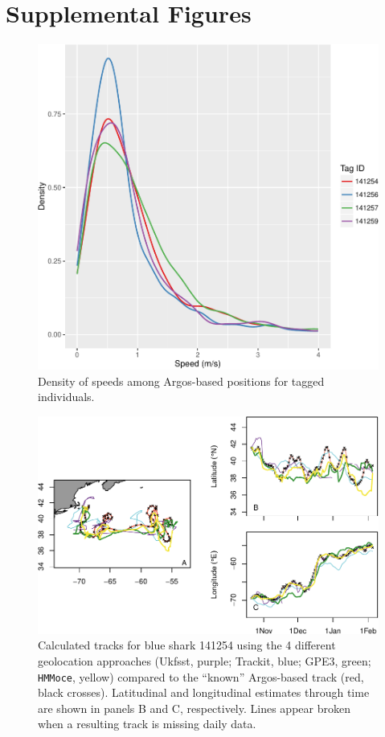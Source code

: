 \section{Supplemental Figures}
\begin{figure}[p]
\centering
\includegraphics[width=.5\textwidth]{images/A1_Fig1.pdf}
\caption{Density of speeds among Argos-based positions for
tagged individuals.}
\label{fig:a1f1}
\end{figure}

\begin{figure}[p]
\centering
\includegraphics[width=1\textwidth]{images/A1_Fig2.pdf}
\caption{Calculated tracks for blue shark 141254
using the 4 different geolocation approaches (Ukfsst, purple; Trackit,
blue; GPE3, green; \texttt{HMMoce}, yellow) compared to the ``known''
Argos-based track (red, black crosses). Latitudinal and longitudinal
estimates through time are shown in panels B and C, respectively. Lines
appear broken when a resulting track is missing daily data.}
\label{fig:a1f2}
\end{figure}

